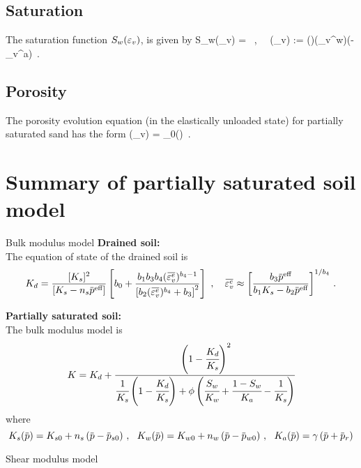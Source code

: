   \subsection{Saturation}
  The saturation function $S_w(\varepsilon_v)$, is given by
  \Beq
    S_w(\Veps_v) =  ~,~~
    \CalC(\Veps_v) := \left(\right)\exp(\Veps_v^w)\exp(-\Veps_v^a) \,.
  \Eeq
  
  \subsection{Porosity}
  The porosity evolution equation (in the elastically unloaded state) for partially saturated sand 
  has the form
  \Beq
    \phi(\Veps_v)
      = \phi_0\left(\right)
          \,.
  \Eeq

\section{Summary of partially saturated soil model}

  \begin{SummaryBox}[label=box:BulkModulusModel]{Bulk modulus model}
  {\bf Drained soil:}\\
  The equation of state of the drained soil is
  \[
    K_d = \frac{[K_s]^2}{[K_s - n_s \pbar^\Teff]}
      \left[b_0 + 
      \frac{b_1 b_3 b_4 (\bar{\Veps_v^e})^{b_4 - 1}}{\left[b_2 (\bar{\Veps_v^e})^{b_4} + b_3\right]^2}\right] 
    ~,\quad
   \bar{\Veps_v^e} \approx \left[\frac{b_3 \pbar^\Teff}{b_1 K_s - b_2 \pbar^\Teff}\right]^{1/b_4} \,.
  \]

  {\bf Partially saturated soil:}\\
  The bulk modulus model is
  \[
    K = K_d + \cfrac{\left(1 - \cfrac{K_d}{K_s}\right)^2}%
          {\cfrac{1}{K_s}\left(1 - \cfrac{K_d}{K_s}\right) + 
             \phi \left(\cfrac{S_w}{K_w} + \cfrac{1-S_w}{K_a} - \cfrac{1}{K_s}\right)}
  \]
  where
  \[
    K_s(\pbar) = K_{s0} + n_s\,(\pbar - \pbar_{s0}) ~,~~
    K_w(\pbar) = K_{w0} + n_w\,(\pbar - \pbar_{w0}) ~,~~
    K_a(\pbar) = \gamma\,(\pbar + \pbar_r) 
  \]
  \end{SummaryBox}

  \begin{SummaryBox}[label=box:ShearModulusModel]{Shear modulus model}
  \end{SummaryBox}

